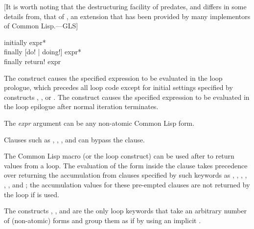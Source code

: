 [It is worth noting that the destructuring facility of  predates,
and differs in some details from, that
of , an extension that has been provided by many implementors
of Common Lisp.---GLS]

\begin{defloop}
initially {expr}* \\
finally [\!do! | \!doing!] {expr}* \\
finally \!return! expr

The  construct causes the specified expression to be evaluated
in the loop prologue, which precedes all loop code except for 
initial settings specified by constructs , , or
.
The  construct causes the specified expression to be evaluated
in the loop epilogue after normal iteration terminates.

The {\it expr\/} argument can be any non-atomic Common Lisp form.

Clauses such as , , , and 
can bypass the  clause.

The Common Lisp macro  (or the  loop construct) can be used
after  to return
values from a loop.  The evaluation of the  form inside the
 clause takes precedence over returning the accumulation
from clauses specified by such keywords as , , 
, , , , and ; 
the accumulation values for these pre-empted clauses are not returned by 
the loop if  is used.

The constructs , , and  are the
only loop keywords that take an arbitrary number of (non-atomic) forms and group
them as if by using an implicit .  

\goodbreak


\end{defloop}
